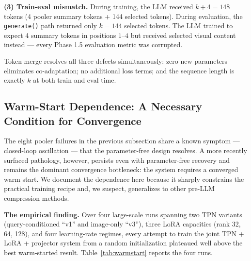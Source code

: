 \documentclass{article}
\begin{document}
\textbf{(3) Train-eval mismatch.}
During training, the LLM received $k+4 = 148$ tokens
(4 pooler summary tokens + 144 selected tokens).
During evaluation, the \texttt{generate()} path returned only $k=144$ selected tokens.
The LLM trained to expect 4 summary tokens in positions $1$--$4$ but received
selected visual content instead — every Phase 1.5 evaluation metric was corrupted.

Token merge resolves all three defects simultaneously: zero new parameters eliminates
co-adaptation; no additional loss terms; and the sequence length is exactly $k$
at both train and eval time.

\subsection{Warm-Start Dependence: A Necessary Condition for Convergence}
\label{sec:warmstart}

The eight pooler failures in the previous subsection share a known
symptom — closed-loop oscillation — that the parameter-free design
resolves. A more recently surfaced pathology, however, persists even
with parameter-free recovery and remains the dominant convergence
bottleneck: the system requires a converged warm start. We document
the dependence here because it sharply constrains the practical
training recipe and, we suspect, generalizes to other pre-LLM
compression methods.

\textbf{The empirical finding.}
Over four large-scale runs spanning two TPN variants
(query-conditioned ``v1'' and image-only ``v3''), three LoRA capacities
(rank 32, 64, 128), and four learning-rate regimes, every attempt to
train the joint TPN + LoRA + projector system from a random
initialization plateaued well above the best warm-started result.
Table~\ref{tab:warmstart} reports the four runs.
\end{document}
